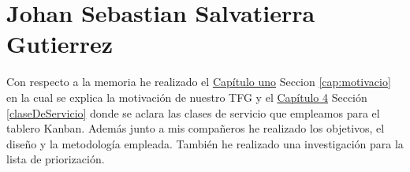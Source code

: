 \section{Johan Sebastian Salvatierra Gutierrez}
Con respecto a la memoria he realizado el {\hyperref[cap:motivacio]{Capítulo uno}} Seccion \ref{cap:motivacio} en la cual se explica la motivación de nuestro TFG y el {\hyperref[claseDeServicio]{Capítulo 4}} Sección \ref{claseDeServicio} donde se aclara las clases de servicio que empleamos para el tablero Kanban.
Además junto a mis compañeros he realizado los objetivos, el diseño y la metodología empleada. También he realizado una investigación para la lista de priorización.